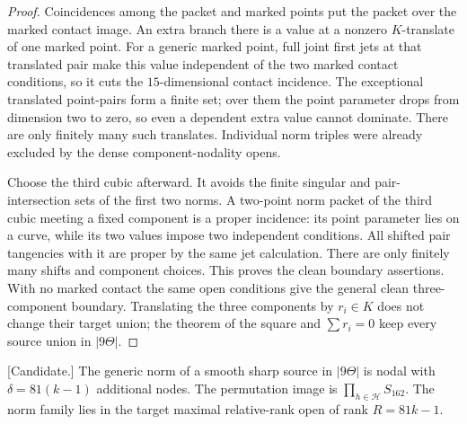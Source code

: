\begin{proof}
Coincidences among the packet and marked points put the packet
over the marked contact image. An extra branch there is a value
at a nonzero $K$-translate of one marked point. For a generic
marked point, full joint first jets at that translated pair make
this value independent of the two marked contact conditions,
so it cuts the $15$-dimensional contact incidence. The exceptional
translated point-pairs form a finite set; over them the point
parameter drops from dimension two to zero, so even a dependent
extra value cannot dominate. There are only finitely many such
translates. Individual norm triples were already excluded by the
dense component-nodality opens.

Choose the third cubic afterward. It avoids the finite singular
and pair-intersection sets of the first two norms. A two-point
norm packet of the third cubic meeting a fixed component is a
proper incidence: its point parameter lies on a curve, while
its two values impose two independent conditions. All shifted
pair tangencies with it are proper by the same jet calculation.
There are only finitely many shifts and component choices.
This proves the clean boundary assertions. With no marked contact
the same open conditions give the general clean three-component
boundary. Translating the three components by $r_i\in K$ does
not change their target union; the theorem of the square and
$\sum r_i=0$ keep every source union in $|9\Theta|$.
\end{proof}

\begin{lemma}
\label{lem:nine-theta-node-product-candidate}
\textup{[Candidate.]}
The generic norm of a smooth sharp source in $|9\Theta|$ is nodal
with $\delta=81(k-1)$ additional nodes. The permutation image is
$\prod_{h\in\mathcal H}S_{162}$. The norm family lies in the
target maximal relative-rank open of rank $R=81k-1$.
\end{lemma}

